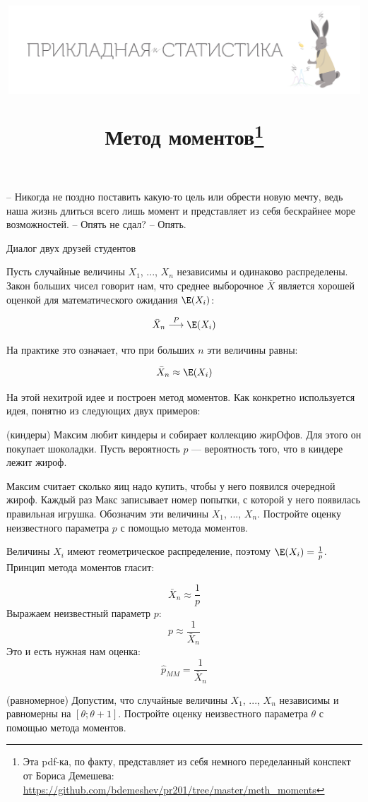 \documentclass[12pt, a4paper, oneside]{article}
\title{\begin{center} \includegraphics[width=0.99\textwidth]{logo.png} \end{center} Метод моментов\footnote{Эта pdf-ка, по факту, представляет из себя немного переделанный конспект от Бориса Демешева:  \url{https://github.com/bdemeshev/pr201/tree/master/meth_moments}}}
\date{ } %
\begin{document}

\maketitle

\epigraph{-- Никогда не поздно поставить какую-то цель или обрести новую мечту, ведь наша жизнь длиться всего лишь момент и представляет из себя бескрайнее море возможностей. \newline -- Опять не сдал? \newline -- Опять. }{Диалог двух друзей студентов}

Пусть случайные величины $X_{1}$, ..., $X_{n}$ независимы и одинаково распределены. Закон больших чисел говорит нам, что среднее выборочное $ \bar{X} $ является хорошей оценкой для математического ожидания $ \E(X_{i}) $:

\[ \bar{X}_{n} \stackrel{P}{\longrightarrow} \E(X_{i}) \]

На практике это означает, что при больших $ n $ эти величины равны:

\[ \bar{X}_{n}\approx \E(X_{i}) \]

На этой нехитрой идее и построен метод моментов. Как конкретно используется идея, понятно из следующих двух примеров:

\begin{problem}{(киндеры)}
	Максим любит киндеры и собирает коллекцию жирОфов. Для этого он покупает шоколадки. Пусть вероятность $p$ --- вероятность того, что в киндере лежит жироф.
	
	Максим считает сколько яиц надо купить, чтобы у него появился очередной жироф. Каждый раз Макс записывает номер попытки, с которой у него появилась правильная игрушка. Обозначим эти величины $X_{1}$, ..., $ X_{n} $. Постройте оценку неизвестного параметра $ p $ с помощью метода моментов. 
\end{problem}

\begin{sol}
	Величины $ X_{i} $ имеют геометрическое распределение, поэтому $ \E(X_{i})=\frac{1}{p} $. Принцип метода моментов гласит:
	
	\[ \bar{X}_{n}\approx \frac{1}{p}\]
	Выражаем неизвестный параметр $ p $:
	\[ p\approx \frac{1}{\bar{X}_{n}} \]
	Это и есть нужная нам оценка:
	\[ \hat{p}_{MM} = \frac{1}{\bar{X}_{n}} \]
\end{sol}


\begin{problem}{(равномерное)}
Допустим, что случайные величины $ X_{1} $, ..., $ X_{n} $ независимы и равномерны на $ [\theta;\theta+1] $. Постройте оценку неизвестного параметра $ \theta $ с помощью метода моментов.
\end{problem}
\end{document}
